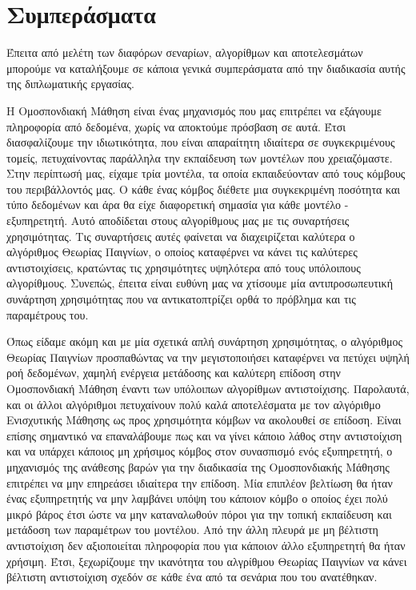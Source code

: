 \chapter{Συμπεράσματα}

Έπειτα από μελέτη των διαφόρων σεναρίων, αλγορίθμων και αποτελεσμάτων μπορούμε να καταλήξουμε σε κάποια γενικά συμπεράσματα από την διαδικασία αυτής της διπλωματικής εργασίας.

Η Ομοσπονδιακή Μάθηση είναι ένας μηχανισμός που μας επιτρέπει να εξάγουμε πληροφορία από δεδομένα, χωρίς να αποκτούμε πρόσβαση σε αυτά. Έτσι διασφαλίζουμε την ιδιωτικότητα, που είναι απαραίτητη ιδιαίτερα σε συγκεκριμένους τομείς, πετυχαίνοντας παράλληλα την εκπαίδευση των μοντέλων που χρειαζόμαστε. Στην περίπτωσή μας, είχαμε τρία μοντέλα, τα οποία εκπαιδεύονταν από τους κόμβους του περιβάλλοντός μας. Ο κάθε ένας κόμβος διέθετε μια συγκεκριμένη ποσότητα και τύπο δεδομένων και άρα θα είχε διαφορετική σημασία για κάθε μοντέλο - εξυπηρετητή. Αυτό αποδίδεται στους αλγορίθμους μας με τις συναρτήσεις χρησιμότητας. Τις συναρτήσεις αυτές φαίνεται να διαχειρίζεται καλύτερα ο αλγόριθμος Θεωρίας Παιγνίων, ο οποίος καταφέρνει να κάνει τις καλύτερες αντιστοιχίσεις, κρατώντας τις χρησιμότητες υψηλότερα από τους υπόλοιπους αλγορίθμους. Συνεπώς, έπειτα είναι ευθύνη μας να χτίσουμε μία αντιπροσωπευτική συνάρτηση χρησιμότητας που να αντικατοπτρίζει ορθά το πρόβλημα και τις παραμέτρους του. 

Όπως είδαμε ακόμη και με μία σχετικά απλή συνάρτηση χρησιμότητας, ο αλγόριθμος Θεωρίας Παιγνίων προσπαθώντας να την μεγιστοποιήσει καταφέρνει να πετύχει υψηλή ροή δεδομένων, χαμηλή ενέργεια μετάδοσης και καλύτερη επίδοση στην Ομοσπονδιακή Μάθηση έναντι των υπόλοιπων αλγορίθμων αντιστοίχισης. Παρολαυτά, και οι άλλοι αλγόριθμοι πετυχαίνουν πολύ καλά αποτελέσματα με τον αλγόριθμο Ενισχυτικής Μάθησης ως προς χρησιμότητα κόμβων να ακολουθεί σε επίδοση. Είναι επίσης σημαντικό να επαναλάβουμε πως και να γίνει κάποιο λάθος στην αντιστοίχιση και να υπάρχει κάποιος μη χρήσιμος κόμβος στον συνασπισμό ενός εξυπηρετητή, ο μηχανισμός της ανάθεσης βαρών για την διαδικασία της Ομοσπονδιακής Μάθησης επιτρέπει να μην επηρεάσει ιδιαίτερα την επίδοση. Μία επιπλέον βελτίωση θα ήταν ένας εξυπηρετητής να μην λαμβάνει υπόψη του κάποιον κόμβο ο οποίος έχει πολύ μικρό βάρος έτσι ώστε να μην καταναλωθούν πόροι για την τοπική εκπαίδευση και μετάδοση των παραμέτρων του μοντέλου. Από την άλλη πλευρά με μη βέλτιστη αντιστοίχιση δεν αξιοποιείται πληροφορία που για κάποιον άλλο εξυπηρετητή θα ήταν χρήσιμη. Έτσι, ξεχωρίζουμε την ικανότητα του αλγρίθμου Θεωρίας Παιγνίων να κάνει βέλτιστη αντιστοίχιση σχεδόν σε κάθε ένα από τα σενάρια που του ανατέθηκαν.